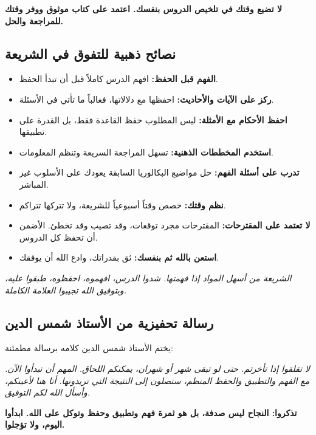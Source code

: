 \documentclass[12pt,a4paper]{book}
\newcommand{\quoteAr}[1]{%
	\begin{myquote}
		\itshape #1
	\end{myquote}
}
\newcommand{\importantAr}[1]{%
	\begin{important}
		\bfseries #1
	\end{important}
}
\begin{document}
	\importantAr{لا تضيع وقتك في تلخيص الدروس بنفسك. اعتمد على كتاب موثوق ووفر وقتك للمراجعة والحل.}
	
	\subsection{نصائح ذهبية للتفوق في الشريعة}
	\label{sec:random-tips14}
	
	\begin{itemize}
		\item \textbf{الفهم قبل الحفظ:} افهم الدرس كاملاً قبل أن تبدأ الحفظ.
		\item \textbf{ركز على الآيات والأحاديث:} احفظها مع دلالاتها، فغالباً ما تأتي في الأسئلة.
		\item \textbf{احفظ الأحكام مع الأمثلة:} ليس المطلوب حفظ القاعدة فقط، بل القدرة على تطبيقها.
		\item \textbf{استخدم المخططات الذهنية:} تسهل المراجعة السريعة وتنظم المعلومات.
		\item \textbf{تدرب على أسئلة الفهم:} حل مواضيع البكالوريا السابقة يعودك على الأسلوب غير المباشر.
		\item \textbf{نظم وقتك:} خصص وقتاً أسبوعياً للشريعة، ولا تتركها تتراكم.
		\item \textbf{لا تعتمد على المقترحات:} المقترحات مجرد توقعات، وقد تصيب وقد تخطئ. الأضمن أن تحفظ كل الدروس.
		\item \textbf{استعن بالله ثم بنفسك:} ثق بقدراتك، وادع الله أن يوفقك.
	\end{itemize}
	
	\quoteAr{الشريعة من أسهل المواد إذا فهمتها. شدوا الدرس، افهموه، احفظوه، طبقوا عليه، وبتوفيق الله تجيبوا العلامة الكاملة.}
	
	\subsection{رسالة تحفيزية من الأستاذ شمس الدين}
	
	يختم الأستاذ شمس الدين كلامه برسالة مطمئنة:
	
	\quoteAr{لا تقلقوا إذا تأخرتم. حتى لو تبقى شهر أو شهران، يمكنكم اللحاق. المهم أن تبدأوا الآن. مع الفهم والتطبيق والحفظ المنظم، ستصلون إلى النتيجة التي تريدونها. أنا هنا لأعينكم، وأسأل الله لكم التوفيق.}
	
	\importantAr{تذكروا: النجاح ليس صدفة، بل هو ثمرة فهم وتطبيق وحفظ وتوكل على الله. ابدأوا اليوم، ولا تؤجلوا.}
	
\end{document}
